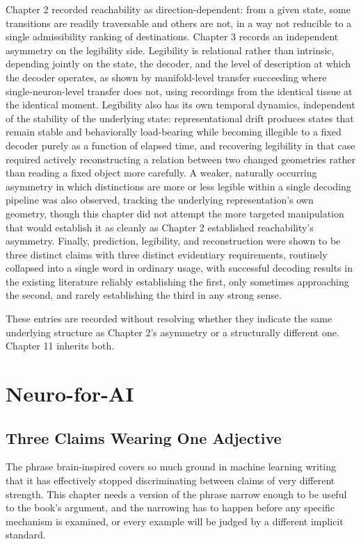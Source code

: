 \documentclass[11pt]{book}
\begin{document}
Chapter 2 recorded reachability as direction-dependent: from a given state, some transitions are readily traversable and others are not, in a way not reducible to a single admissibility ranking of destinations. Chapter 3 records an independent asymmetry on the legibility side. Legibility is relational rather than intrinsic, depending jointly on the state, the decoder, and the level of description at which the decoder operates, as shown by manifold-level transfer succeeding where single-neuron-level transfer does not, using recordings from the identical tissue at the identical moment. Legibility also has its own temporal dynamics, independent of the stability of the underlying state: representational drift produces states that remain stable and behaviorally load-bearing while becoming illegible to a fixed decoder purely as a function of elapsed time, and recovering legibility in that case required actively reconstructing a relation between two changed geometries rather than reading a fixed object more carefully. A weaker, naturally occurring asymmetry in which distinctions are more or less legible within a single decoding pipeline was also observed, tracking the underlying representation's own geometry, though this chapter did not attempt the more targeted manipulation that would establish it as cleanly as Chapter 2 established reachability's asymmetry. Finally, prediction, legibility, and reconstruction were shown to be three distinct claims with three distinct evidentiary requirements, routinely collapsed into a single word in ordinary usage, with successful decoding results in the existing literature reliably establishing the first, only sometimes approaching the second, and rarely establishing the third in any strong sense.

These entries are recorded without resolving whether they indicate the same underlying structure as Chapter 2's asymmetry or a structurally different one. Chapter 11 inherits both.


\chapter{Neuro-for-AI}

\section{Three Claims Wearing One Adjective}

The phrase brain-inspired covers so much ground in machine learning writing that it has effectively stopped discriminating between claims of very different strength. This chapter needs a version of the phrase narrow enough to be useful to the book's argument, and the narrowing has to happen before any specific mechanism is examined, or every example will be judged by a different implicit standard.
\end{document}
